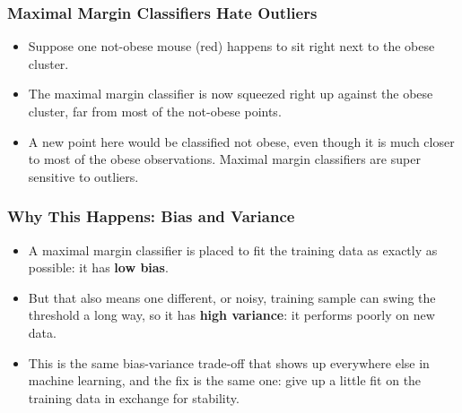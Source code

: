 \begin{frame}[fragile] \frametitle{Maximal Margin Classifiers Hate Outliers}
\begin{itemize}
\item Suppose one not-obese mouse (red) happens to sit right next to the obese cluster.
\end{itemize}
\begin{center}
\end{center}
\begin{itemize}
\item The maximal margin classifier is now squeezed right up against the obese cluster, far from most of the not-obese points.
\item A new point here would be classified not obese, even though it is much closer to most of the obese observations. Maximal margin classifiers are super sensitive to outliers.
\end{itemize}
\end{frame}

\begin{frame}[fragile] \frametitle{Why This Happens: Bias and Variance}
\begin{itemize}
\item A maximal margin classifier is placed to fit the training data as exactly as possible: it has \textbf{low bias}.
\item But that also means one different, or noisy, training sample can swing the threshold a long way, so it has \textbf{high variance}: it performs poorly on new data.
\item This is the same bias-variance trade-off that shows up everywhere else in machine learning, and the fix is the same one: give up a little fit on the training data in exchange for stability.
\end{itemize}
\end{frame}


